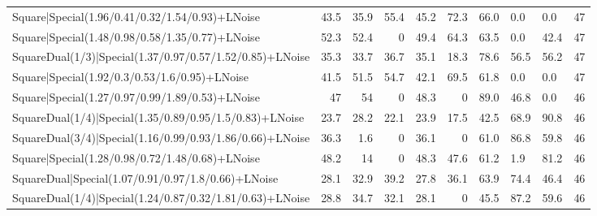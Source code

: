 \begin{tabular}{lrrrrrlllr}
 Square|Special(1.96/0.41/0.32/1.54/0.93)+LNoise                 &            43.5 &            35.9 &            55.4 &            45.2 &           72.3 & 66.0            & 0.0            & 0.0            &           47 \\
 Square|Special(1.48/0.98/0.58/1.35/0.77)+LNoise                 &            52.3 &            52.4 &             0   &            49.4 &           64.3 & 63.5            & 0.0            & 42.4           &           47 \\
 SquareDual(1/3)|Special(1.37/0.97/0.57/1.52/0.85)+LNoise        &            35.3 &            33.7 &            36.7 &            35.1 &           18.3 & 78.6            & 56.5           & 56.2           &           47 \\
 Square|Special(1.92/0.3/0.53/1.6/0.95)+LNoise                   &            41.5 &            51.5 &            54.7 &            42.1 &           69.5 & 61.8            & 0.0            & 0.0            &           47 \\
 Square|Special(1.27/0.97/0.99/1.89/0.53)+LNoise                 &            47   &            54   &             0   &            48.3 &            0   & 89.0            & 46.8           & 0.0            &           46 \\
 SquareDual(1/4)|Special(1.35/0.89/0.95/1.5/0.83)+LNoise         &            23.7 &            28.2 &            22.1 &            23.9 &           17.5 & 42.5            & 68.9           & 90.8           &           46 \\
 SquareDual(3/4)|Special(1.16/0.99/0.93/1.86/0.66)+LNoise        &            36.3 &             1.6 &             0   &            36.1 &            0   & 61.0            & 86.8           & 59.8           &           46 \\
 Square|Special(1.28/0.98/0.72/1.48/0.68)+LNoise                 &            48.2 &            14   &             0   &            48.3 &           47.6 & 61.2            & 1.9            & 81.2           &           46 \\
 SquareDual|Special(1.07/0.91/0.97/1.8/0.66)+LNoise              &            28.1 &            32.9 &            39.2 &            27.8 &           36.1 & 63.9            & 74.4           & 46.4           &           46 \\
 SquareDual(1/4)|Special(1.24/0.87/0.32/1.81/0.63)+LNoise        &            28.8 &            34.7 &            32.1 &            28.1 &            0   & 45.5            & 87.2           & 59.6           &           46 \\

\end{tabular}
